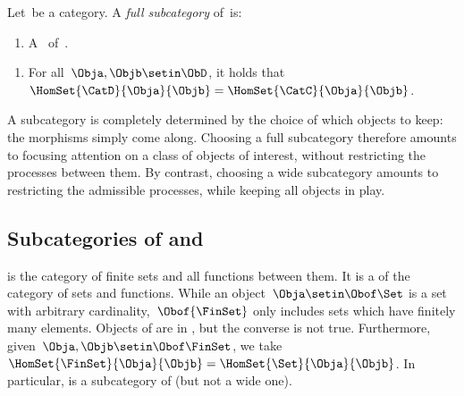 \begin{ctdefinition}
    \label{def:full-subcategory}
    Let~\CatC be a category.
    A \emph{full subcategory} of~\CatC is:

    \constit

    \begin{enumerate}
        \item A ~\CatD of~\CatC.
    \end{enumerate}

    \condit

    \begin{enumerate}
        \item For all~$\Obja, \Objb \setin \ObD$, it holds that $\HomSet{\CatD}{\Obja}{\Objb} = \HomSet{\CatC}{\Obja}{\Objb}$.
    \end{enumerate}
\end{ctdefinition}

\begin{remark}
    A  subcategory is completely determined by the choice of which objects to keep: the morphisms simply come along.
    Choosing a full subcategory therefore amounts to focusing attention on a class of objects of interest, without restricting the processes between them.
    By contrast, choosing a wide subcategory amounts to restricting the admissible processes, while keeping all objects in play.
\end{remark}

\subsection{Subcategories of \Set and \Rel}

\begin{example}[\FinSet]
    \label{ex:FinSet}
    \FinSet is the category of finite sets and all functions between them.
    It is a  of the category \Set of sets and functions.
    While an object~$\Obja \setin \Obof\Set$ is a set with arbitrary cardinality,~$\Obof{\FinSet}$ only includes sets which have finitely many elements.
    Objects of \FinSet are in \Set, but the converse is not true.
    Furthermore, given~$\Obja,\Objb\setin \Obof\FinSet$, we take~$\HomSet{\FinSet}{\Obja}{\Objb} =\HomSet{\Set}{\Obja}{\Objb}$.
    In particular, \FinSet is a  subcategory of \Set (but not a wide one).
\end{example}

